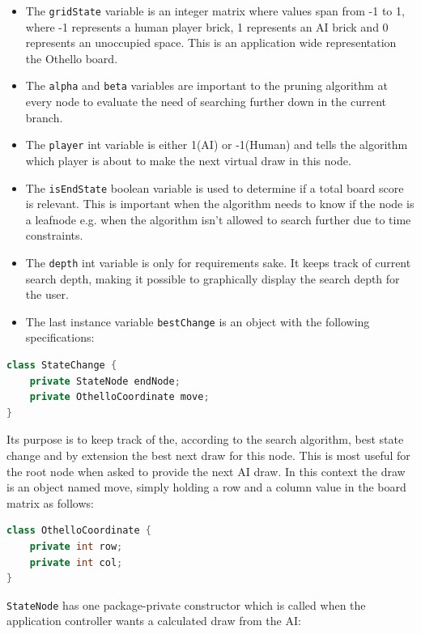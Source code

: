 \documentclass{article}
\begin{document}
\begin{itemize}
\item The \verb|gridState| variable is an integer matrix where values span from -1 to 1,
where -1 represents a human player brick, 1 represents an AI brick and 0 represents
an unoccupied space. This is an application wide representation the Othello board.

 \item The \verb|alpha| and \verb|beta| variables are important to the pruning algorithm at
every node to evaluate the need of searching further down in the current branch.

\item The \verb|player| int variable is either 1(AI) or -1(Human) and tells the algorithm
which player is about to make the next virtual draw in this node.

\item The \verb|isEndState| boolean variable is used to determine if a total board score
is relevant. This is important when the algorithm needs to know if the node is a
leafnode e.g. when the algorithm isn't allowed to search further due to time constraints.

\item The \verb|depth| int variable is only for requirements sake. It keeps
track of current search depth, making it possible to graphically display the search depth for the user.

\item The last instance variable \verb|bestChange| is an object with the following specifications:
\end{itemize}

\begin{lstlisting}[language=Java]
class StateChange {
    private StateNode endNode;
    private OthelloCoordinate move;
}
\end{lstlisting}

Its purpose is to keep track of the, according to the search algorithm, best state
change and by extension the best next draw for this node. This is most useful
for the root node when asked to provide the next AI draw. In this context the draw
is an object named move, simply holding a row and a column value in the board matrix as follows:
\begin{lstlisting}[language=Java]
class OthelloCoordinate {
    private int row;
    private int col;
}
\end{lstlisting}

\verb|StateNode| has one package-private constructor which is called when the application
controller wants a calculated draw from the AI:
\end{document}
